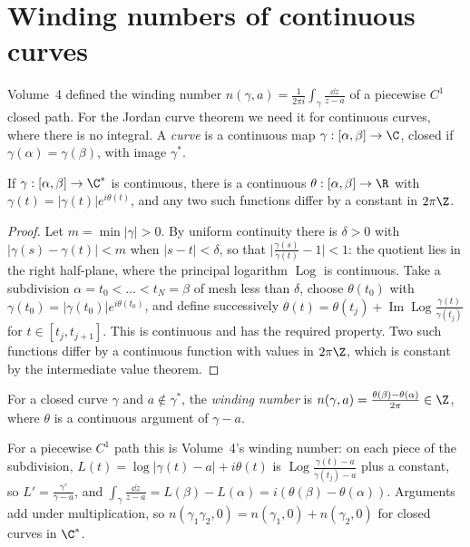\section{Winding numbers of continuous curves}

Volume~4 defined the winding number $n(\gamma,a)=\frac1{2\pi i}\int_\gamma\frac{\dd z}{z-a}$ of a piecewise $C^1$ closed path. For the Jordan curve theorem we need it for
continuous curves, where there is no integral. A \emph{curve} is a continuous map $\gamma:[\alpha,\beta]\to\C$, closed if $\gamma(\alpha)=\gamma(\beta)$, with image $\gamma^*$.

\begin{lemma}\label{lem:lift}
If $\gamma:[\alpha,\beta]\to\C^*$ is continuous, there is a continuous $\theta:[\alpha,\beta]\to\R$ with $\gamma(t)=|\gamma(t)|e^{i\theta(t)}$, and any two such functions differ by
a constant in $2\pi\Z$.
\end{lemma}
\begin{proof}
Let $m=\min|\gamma|>0$. By uniform continuity there is $\delta>0$ with $|\gamma(s)-\gamma(t)|<m$ when $|s-t|<\delta$, so that $\bigl|\frac{\gamma(s)}{\gamma(t)}-1\bigr|<1$: the quotient lies
in the right half-plane, where the principal logarithm $\operatorname{Log}$ is continuous. Take a subdivision $\alpha=t_0<\dots<t_N=\beta$ of mesh less than $\delta$, choose $\theta(t_0)$ with
$\gamma(t_0)=|\gamma(t_0)|e^{i\theta(t_0)}$, and define successively $\theta(t)=\theta(t_j)+\operatorname{Im}\operatorname{Log}\frac{\gamma(t)}{\gamma(t_j)}$ for $t\in[t_j,t_{j+1}]$. This is continuous and has the required
property. Two such functions differ by a continuous function with values in $2\pi\Z$, which is constant by the intermediate value theorem.
\end{proof}

\begin{definition}
For a closed curve $\gamma$ and $a\notin\gamma^*$, the \emph{winding number} is $n(\gamma,a)=\frac{\theta(\beta)-\theta(\alpha)}{2\pi}\in\Z$, where $\theta$ is a continuous argument of $\gamma-a$.
\end{definition}

For a piecewise $C^1$ path this is Volume~4's winding number: on each piece of the subdivision, $L(t)=\log|\gamma(t)-a|+i\theta(t)$ is
$\operatorname{Log}\frac{\gamma(t)-a}{\gamma(t_j)-a}$ plus a constant, so $L'=\frac{\gamma'}{\gamma-a}$, and $\int_\gamma\frac{\dd z}{z-a}=L(\beta)-L(\alpha)=i(\theta(\beta)-\theta(\alpha))$. Arguments add under
multiplication, so $n(\gamma_1\gamma_2,0)=n(\gamma_1,0)+n(\gamma_2,0)$ for closed curves in $\C^*$.

